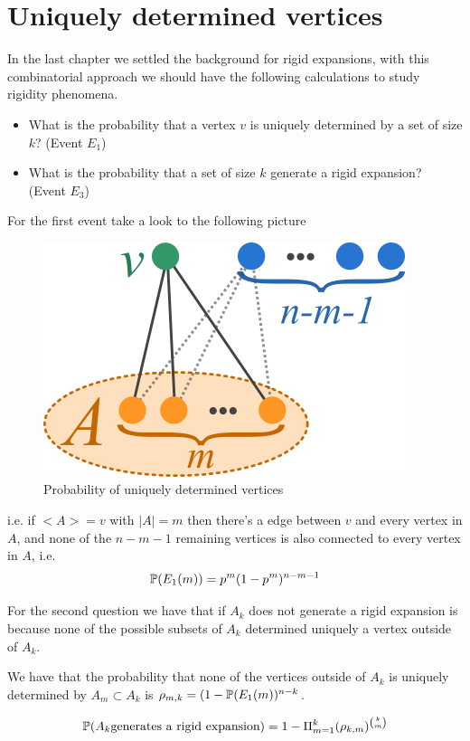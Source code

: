 \section{Uniquely determined vertices}

In the last chapter we settled the background for rigid expansions, with this combinatorial approach we should have the following calculations to study rigidity phenomena.

\begin{itemize}
\item What is the probability that a vertex $v$ is uniquely determined by a set of size $k$? (Event $E_1$)
\item What is the probability that a set of size $k$ generate a rigid expansion? (Event $E_3$)
\end{itemize}

For the first event take a look to the following picture

\begin{figure}[h!]
	\centering
	\includegraphics[scale=0.8]{figures/uni.png}
	\caption{Probability of uniquely determined vertices}
\end{figure}

i.e. if $<A> = v$ with $|A| = m$ then there's a edge between $v$ and every vertex in $A$, and none of the $n-m-1$ remaining vertices is also connected to every vertex in $A$, i.e.
$$\P(E_1(m)) = p^{m}(1-p^{m})^{n-m-1}$$

For the second question we have that if $A_k$ does not generate a rigid expansion is because none of the possible subsets of $A_k$ determined uniquely a vertex outside of $A_k$. 

We have that the probability that none of the vertices outside of $A_k$ is uniquely determined by $A_m\subset A_k$ is $\rho_{m,k} = (1 -  \P(E_1(m) )^{n-k}$.

$$\P(A_k \text{generates a rigid expansion}) = 1 -  \Pi_{m=1}^{k} (\rho_{k,m})^{\binom{k}{m}}  $$

